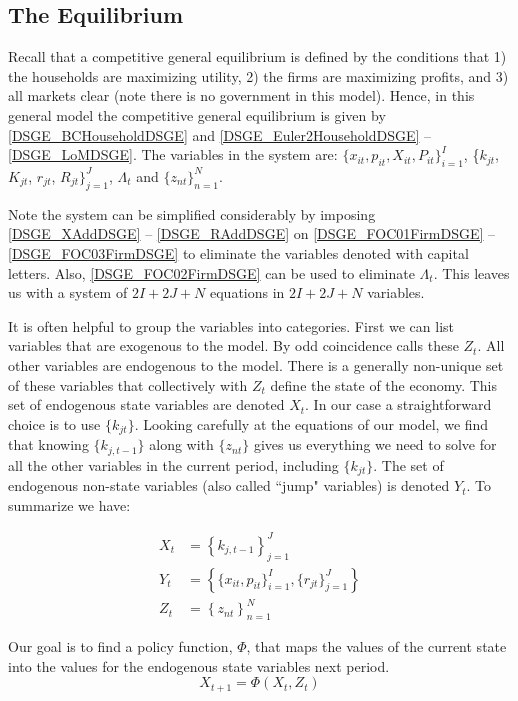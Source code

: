 \documentclass[letterpaper,12pt]{article}
\theoremstyle{definition}
\begin{document}
\begin{spacing}{1.5}
	\subsection{The Equilibrium}
		Recall that a competitive general equilibrium is defined by the conditions that 1) the households are maximizing utility, 2) the firms are maximizing profits, and 3) all markets clear (note there is no government in this model). Hence, in this general model the competitive general equilibrium is given by \eqref{DSGE_BCHouseholdDSGE} and \eqref{DSGE_Euler2HouseholdDSGE} -- \eqref{DSGE_LoMDSGE}. The variables in the system are: $\{x_{it}, p_{it}, X_{it}, P_{it}\}_{i=1}^I$, \{$k_{jt}$, $K_{jt}$, $r_{jt}$, $R_{jt}\}_{j=1}^J$, $\Lambda_t$ and $\{z_{nt}\}_{n=1}^N$.

		Note the system can be simplified considerably by imposing \eqref{DSGE_XAddDSGE} -- \eqref{DSGE_RAddDSGE} on \eqref{DSGE_FOC01FirmDSGE} -- \eqref{DSGE_FOC03FirmDSGE} to eliminate the variables denoted with capital letters. Also,  \eqref{DSGE_FOC02FirmDSGE} can be used to eliminate $\Lambda_t$. This leaves us with a system of $2I+2J+N$ equations in $2I+2J+N$ variables.

		It is often helpful to group the variables into categories. First we can list variables that are exogenous to the model. By odd coincidence \citet{Uhlig1999} calls these $Z_t$. All other variables are endogenous to the model. There is a generally non-unique set of these variables that collectively with $Z_t$ define the state of the economy. This set of endogenous state variables are denoted $X_t$. In our case a straightforward choice is to use $\{k_{jt}\}$. Looking carefully at the equations of our model, we find that knowing $\{k_{j,t-1}\}$ along with $\{z_{nt}\}$ gives us everything we need to solve for all the other variables in the current period, including $\{k_{jt}\}$. The set of endogenous non-state variables (also called ``jump" variables) is denoted $Y_t$. To summarize we have:

		\begin{equation}
		\begin{split}
		X_t & = \left\{k_{j,t-1}\right\}_{j=1}^J \\
		Y_t & = \left\{\{x_{it}, p_{it}\}_{i=1}^I, \{r_{jt}\}_{j=1}^J\right\} \\
		Z_t & = \left\{z_{nt}\right\}_{n=1}^N
		\end{split}
		\end{equation}

		Our goal is to find a policy function, $\Phi$, that maps the values of the current state into the values for the endogenous state variables next period.
		\begin{equation}
		X_{t+1} = \Phi (X_t,Z_t)
		\end{equation}


\end{spacing}
\end{document}
